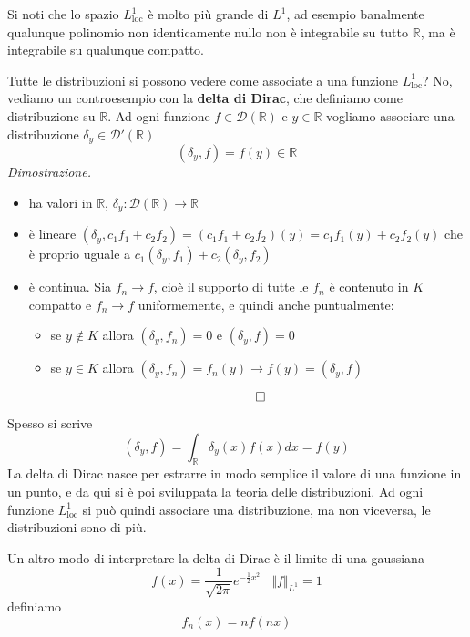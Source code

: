 \documentclass[10pt,a4paper,twoside]{book}
\begin{document}
Si noti che lo spazio $L^{1}_{\mathrm{loc}}$ è molto più grande di $L^{1}$, ad esempio banalmente qualunque polinomio non identicamente nullo non è integrabile su tutto $\mathbb{R}$, ma è integrabile su qualunque compatto.

Tutte le distribuzioni si possono vedere come associate a una funzione $L^{1}_{\mathrm{loc}}$? No, vediamo un controesempio con la \textbf{delta di Dirac}, che definiamo come distribuzione su $\mathbb{R}$. Ad ogni funzione $f\in \mathcal{D}(\mathbb{R})$ e $y\in \mathbb{R}$ vogliamo associare una distribuzione $\delta _{y} \in \mathcal{D} '(\mathbb{R})$
\begin{equation*}
\boxed{( \delta _{y} ,f) =f( y) \in \mathbb{R}}
\end{equation*}
\textit{Dimostrazione.}
\begin{itemize}
\item ha valori in $\mathbb{R}$, $\delta _{y} :\mathcal{D}(\mathbb{R})\rightarrow \mathbb{R}$
\item è lineare $( \delta _{y} ,c_{1} f_{1} +c_{2} f_{2}) =( c_{1} f_{1} +c_{2} f_{2})( y) =c_{1} f_{1}( y) +c_{2} f_{2}( y)$ che è proprio uguale a $c_{1}( \delta _{y} ,f_{1}) +c_{2}( \delta _{y} ,f_{2})$
\item è continua. Sia $f_{n}\rightarrow f$, cioè il supporto di tutte le $f_{n}$ è contenuto in $K$ compatto e $f_{n}\rightarrow f$ uniformemente, e quindi anche puntualmente:
\begin{itemize}
\item se $y\notin K$ allora $( \delta _{y} ,f_{n}) =0$ e $( \delta _{y} ,f) =0$
\item se $y\in K$ allora $( \delta _{y} ,f_{n}) =f_{n}( y)\rightarrow f( y) =( \delta _{y} ,f)$
\end{itemize}

\begin{equation*}
\qed 
\end{equation*}
\end{itemize}
Spesso si scrive
\begin{equation*}
( \delta _{y} ,f) =\int _{\mathbb{R}} \delta _{y}( x) f( x) dx=f( y)
\end{equation*}
La delta di Dirac nasce per estrarre in modo semplice il valore di una funzione in un punto, e da qui si è poi sviluppata la teoria delle distribuzioni. Ad ogni funzione $L^{1}_{\mathrm{loc}}$ si può quindi associare una distribuzione, ma non viceversa, le distribuzioni sono di più.

Un altro modo di interpretare la delta di Dirac è il limite di una gaussiana
\begin{equation*}
f( x) =\frac{1}{\sqrt{2\pi }} e^{-\frac{1}{2} x^{2}} \ \ \ \ \Vert f\Vert _{L^{1}} =1
\end{equation*}
definiamo
\begin{equation*}
f_{n}( x) =nf( nx)
\end{equation*}
\end{document}
